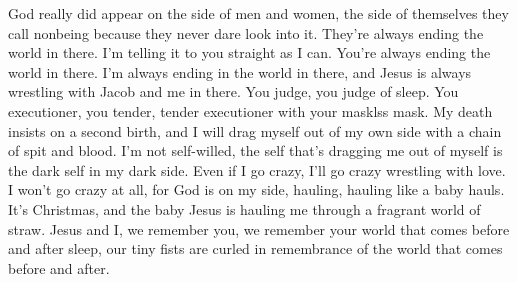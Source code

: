 \documentclass[english,11pt,letterpaper,onecolumn,parskip=full]{scrbook}
\begin{document}
\begin{poem}
\begin{stanza}
God really did appear on the side of men and women, the side of themselves they call nonbeing because they never dare look into it.\verseline
They're always ending the world in there.  I'm telling it to you straight as I can.  You're always ending the world in there.  I'm always ending in the world in there, and Jesus is always wrestling with Jacob and me in there.\verseline
You judge, you judge of sleep.  You executioner, you tender, tender executioner with your masklss mask.\verseline
My death insists on a second birth, and I will drag myself out of my own side with a chain of spit and blood.\verseline
I'm not self-willed, the self that's dragging me out of myself is the dark self in my dark side.\verseline
Even if I go crazy, I'll go crazy wrestling with love.\verseline
I won't go crazy at all, for God is on my side, hauling, hauling like a baby hauls.  It's Christmas, and the baby Jesus is hauling me through a fragrant world of straw.\verseline
Jesus and I, we remember you, we remember your world that comes before and after sleep, our tiny fists are curled in remembrance of the world that comes before and after.
\end{stanza}
\end{poem}

	
\end{document}
